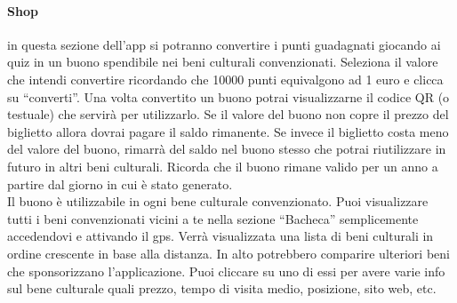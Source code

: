 \documentclass{article}
\begin{document}
\paragraph{Shop} in questa sezione dell’app si potranno convertire i punti guadagnati giocando ai quiz in un buono spendibile nei beni culturali convenzionati. Seleziona il valore che intendi convertire ricordando che 10000 punti equivalgono ad 1 euro e clicca su “converti”. Una volta convertito un buono potrai visualizzarne il codice QR (o testuale) che servirà per utilizzarlo. Se il valore del buono non copre il prezzo del biglietto allora dovrai pagare il saldo rimanente. Se invece il biglietto costa meno del valore del buono, rimarrà del saldo nel buono stesso che potrai riutilizzare in futuro in altri beni culturali. Ricorda che il buono rimane valido per un anno a partire dal giorno in cui è stato generato.
\\\indent
Il buono è utilizzabile in ogni bene culturale convenzionato. Puoi visualizzare tutti i beni convenzionati vicini a te nella sezione “Bacheca” semplicemente accedendovi e attivando il gps. Verrà visualizzata una lista di beni culturali in ordine crescente in base alla distanza. In alto potrebbero comparire ulteriori beni che sponsorizzano l’applicazione. Puoi cliccare su uno di essi per avere varie info sul bene culturale quali prezzo, tempo di visita medio, posizione, sito web, etc.
\end{document}
